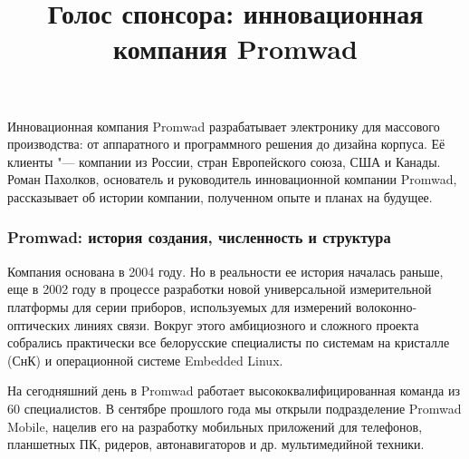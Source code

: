 \documentclass[10pt, a5paper]{article}
\begin{document}
\title{Голос спонсора: инновационная компания Promwad}
\date{}
\maketitle
Инновационная компания Promwad разрабатывает электронику для массового производства: от аппаратного и программного решения до дизайна корпуса. Её клиенты "--- компании из России, стран Европейского союза, США и Канады. 
Роман Пахолков, основатель и руководитель инновационной компании Promwad, рассказывает об истории компании, полученном опыте и планах на будущее.

\subsubsection*{Promwad: история создания, численность и структура}
Компания основана в 2004 году. Но в реальности ее история началась раньше, еще в 2002 году в процессе разработки новой универсальной измерительной платформы для серии приборов, используемых для измерений волоконно-оптических линиях связи. Вокруг этого амбициозного и сложного проекта собрались практически все белорусские специалисты по системам на кристалле (СнК) и операционной системе Embedded Linux. %


На сегодняшний день в Promwad работает высококвалифицированная команда из 60 специалистов. В сентябре прошлого года мы открыли подразделение Promwad Mobile, нацелив его  на разработку мобильных приложений для телефонов, планшетных ПК, ридеров, автонавигаторов и др. мультимедийной техники.
\end{document}
